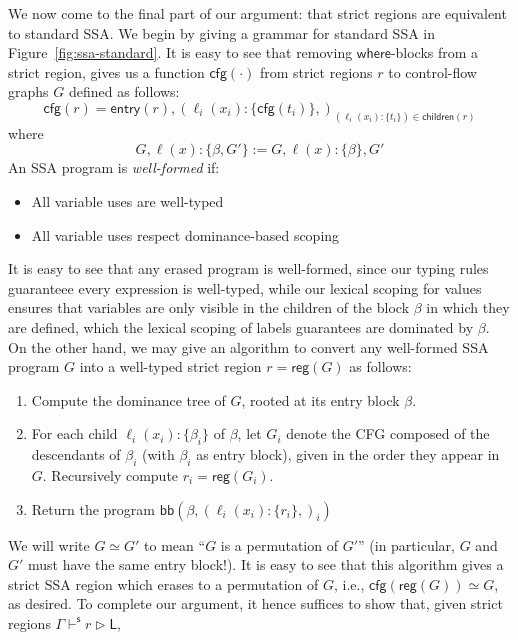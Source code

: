\documentclass[acmsmall,screen,review]{acmart}
\newcommand{\ms}[1]{\ensuremath{\mathsf{#1}}}
\newcommand{\lto}{:}
\newcommand{\wbranch}[3]{#1(#2) \lto \{#3\}}
\newcommand{\shaslb}[3]{#1 \vdash^{\ms{s}} #2 \rhd #3}
\newcommand{\toentry}[1]{\ms{entry}(#1)}
\newcommand{\todom}[1]{\ms{children}(#1)}
\newcommand{\tocfg}[1]{\ms{cfg}(#1)}
\newcommand{\adddom}[2]{\ms{bb}(#1, #2)}
\newcommand{\toreg}[1]{\ms{reg}(#1)}
\begin{document}
We now come to the final part of our argument: that strict regions are equivalent to standard SSA.
We begin by giving a grammar for standard SSA in Figure~\ref{fig:ssa-standard}. It is easy to see
that removing \ms{where}-blocks from a strict region, gives us a function $\tocfg{\cdot}$ from
strict regions $r$ to control-flow graphs $G$ defined as follows:
\begin{equation}
    \tocfg{r} = \toentry{r}, (\wbranch{\ell_i}{x_i}{\tocfg{t_i}},)_{
      (\wbranch{\ell_i}{x_i}{t_i}) \in \todom{r}}
\end{equation}
where
\begin{equation}
  G, \wbranch{\ell}{x}{\beta, G'} := G, \wbranch{\ell}{x}{\beta}, G' 
\end{equation}
An SSA program is \emph{well-formed} if:
\begin{itemize}
  \item All variable uses are well-typed
  \item All variable uses respect dominance-based scoping
\end{itemize}
It is easy to see that any erased program is well-formed, since our typing rules guaranteee every
expression is well-typed, while our lexical scoping for values ensures that variables are only
visible in the children of the block $\beta$ in which they are defined, which the lexical scoping of
labels guarantees are dominated by $\beta$. On the other hand, we may give an algorithm to convert
any well-formed SSA program $G$ into a well-typed strict region $r = \toreg{G}$ as follows:
\begin{enumerate}
  \item Compute the dominance tree of $G$, rooted at its entry block $\beta$.
  \item For each child $\wbranch{\ell_i}{x_i}{\beta_i}$ of $\beta$, let $G_i$ denote the CFG
  composed of the descendants of $\beta_i$ (with $\beta_i$ as entry block), given in the order they
  appear in $G$. Recursively compute $r_i = \toreg{G_i}$.
  \item Return the program $\adddom{\beta}{(\wbranch{\ell_i}{x_i}{r_i},)_i}$
\end{enumerate}
We will write $G \simeq G'$ to mean ``$G$ is a permutation of $G'$'' (in particular, $G$ and $G'$
must have the same entry block!). It is easy to see that this algorithm gives a strict SSA region
which erases to a permutation of $G$, i.e., $\tocfg{\toreg{G}} \simeq G$, as desired. To complete
our argument, it hence suffices to show that, given strict regions $\shaslb{\Gamma}{r}{\ms{L}}$,
\end{document}
